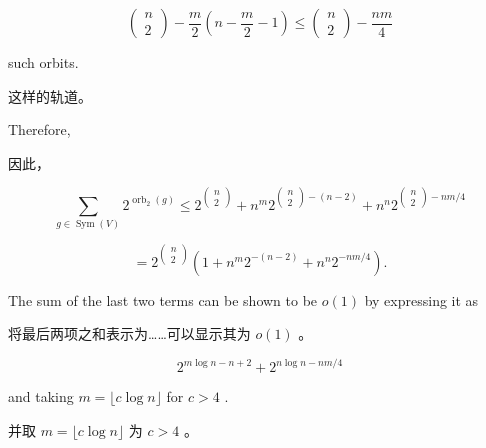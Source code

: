 \documentclass[10pt]{article}
\begin{document}
\[
\left( \begin{array}{l} n \\  2 \end{array}\right)  - \frac{m}{2}\left( {n - \frac{m}{2} - 1}\right)  \leq  \left( \begin{array}{l} n \\  2 \end{array}\right)  - \frac{nm}{4}
\]

such orbits.

\begin{tcolorbox}\relax
这样的轨道。
\end{tcolorbox}

Therefore,

\begin{tcolorbox}\relax
因此，
\end{tcolorbox}

\[
\mathop{\sum }\limits_{{g \in  \operatorname{Sym}\left( V\right) }}{2}^{{\operatorname{orb}}_{2}\left( g\right) } \leq  {2}^{\left( \begin{matrix} n \\  2 \end{matrix}\right) } + {n}^{m}{2}^{\left( \begin{matrix} n \\  2 \end{matrix}\right)  - \left( {n - 2}\right) } + {n}^{n}{2}^{\left( \begin{matrix} n \\  2 \end{matrix}\right)  - {nm}/4}
\]

\[
= {2}^{\left( \begin{matrix} n \\  2 \end{matrix}\right) }\left( {1 + {n}^{m}{2}^{-\left( {n - 2}\right) } + {n}^{n}{2}^{-{nm}/4}}\right) .
\]

The sum of the last two terms can be shown to be \(o\left( 1\right)\) by expressing it as

\begin{tcolorbox}\relax
将最后两项之和表示为……可以显示其为 \(o\left( 1\right)\) 。
\end{tcolorbox}

\[
{2}^{m\log n - n + 2} + {2}^{n\log n - {nm}/4}
\]

and taking \(m = \lfloor c\log n\rfloor\) for \(c > 4\) .

\begin{tcolorbox}\relax
并取 \(m = \lfloor c\log n\rfloor\) 为 \(c > 4\) 。
\end{tcolorbox}
\end{document}
